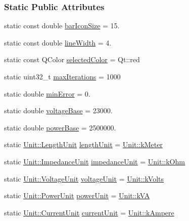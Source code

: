 \subsubsection*{Static Public Attributes}
\begin{DoxyCompactItemize}
\item 
static const double \hyperlink{group___graphics_gaa334bbc93b3fde219840e95e23198b53}{bar\+Icon\+Size} = 15.
\item 
static const double \hyperlink{group___graphics_ga3f810634c9908d62d33a1ab09a76c147}{line\+Width} = 4.
\item 
static const Q\+Color \hyperlink{group___graphics_gaa9e21b8e2a24b0495e776a51e1aeed94}{selected\+Color} = Qt\+::red
\item 
static uint32\+\_\+t \hyperlink{group___graphics_ga318dee060bc577eacd67d332efbbe1b2}{max\+Iterations} = 1000
\item 
static double \hyperlink{group___graphics_gabcdc973129d3dda7572b7a1c388da1b5}{min\+Error} = 0.
\item 
static double \hyperlink{group___graphics_ga7c1e79d9ac69df9a69f24eaf092fd5e5}{voltage\+Base} = 23000.
\item 
static double \hyperlink{group___graphics_ga74bb7aa495d422f1f092acdf958df989}{power\+Base} = 2500000.
\item 
static \hyperlink{class_unit_a8c8921f7b225ad6063b1cb573425b9a0}{Unit\+::\+Length\+Unit} \hyperlink{group___graphics_gae46c0e2bf39b343875e3c69066fe2652}{length\+Unit} = \hyperlink{class_unit_a8c8921f7b225ad6063b1cb573425b9a0abfa41ebe7ee649a1f02c9b8ae570434b}{Unit\+::k\+Meter}
\item 
static \hyperlink{class_unit_a3747e779c805df24a71961290be3fbdf}{Unit\+::\+Impedance\+Unit} \hyperlink{group___graphics_ga5f3d72699a723c64a89d22e34df708ff}{impedance\+Unit} = \hyperlink{class_unit_a3747e779c805df24a71961290be3fbdfa6b9c74d1763eefbaf751eeecff0bd9da}{Unit\+::k\+Ohm}
\item 
static \hyperlink{class_unit_a55b07dfa9457e1eca2c7194fe0cfc3c1}{Unit\+::\+Voltage\+Unit} \hyperlink{group___graphics_gacde031ef95f5c05565ee35769f2ed89e}{voltage\+Unit} = \hyperlink{class_unit_a55b07dfa9457e1eca2c7194fe0cfc3c1aa54b2473993a702a3923525765bd6e4c}{Unit\+::k\+Volts}
\item 
static \hyperlink{class_unit_ace265ae255370ccacfd5370337572c3b}{Unit\+::\+Power\+Unit} \hyperlink{group___graphics_ga9504015bc566f4a3d3b4d4a86000293b}{power\+Unit} = \hyperlink{class_unit_ace265ae255370ccacfd5370337572c3ba72b181a842ae2759488a2fa1410d3696}{Unit\+::k\+V\+A}
\item 
static \hyperlink{class_unit_a0794cf6c9682f48296dd4a5315389787}{Unit\+::\+Current\+Unit} \hyperlink{group___graphics_gac6a26db5fef2b1dd2a00faf6340d1702}{current\+Unit} = \hyperlink{class_unit_a0794cf6c9682f48296dd4a5315389787a368a3c470f0b590a6100dda717a7dd4f}{Unit\+::k\+Ampere}
\end{DoxyCompactItemize}



